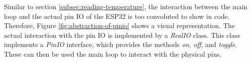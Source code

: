 Similar to section \ref{subsec:reading-temperature}, the interaction between the main loop and the actual pin IO of the ESP32 is too convoluted to show in code.
Therefore, Figure \ref{fig:abstraction-of-pinio} shows a visual representation.
The actual interaction with the pin IO is implemented by a \textit{RealIO} class.
This class implements a \textit{PinIO} interface, which provides the methods \textit{on}, \textit{off}, and \textit{toggle}.
These can then be used the main loop to interact with the physical pins.
